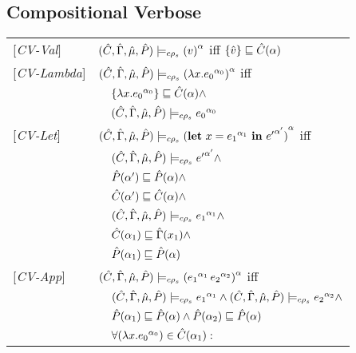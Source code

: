 \subsection{Compositional Verbose}
\begin{table}
\begin{tabular}{l l l l}
{[\textit{CV-Val}]}&\multicolumn{3}{l}{$ \ccestl {v} $ iff $\{\vat\} \sqsubseteq \Cat(\all)$} \\ 
{[\textit{CV-Lambda}]}&\multicolumn{3}{l}{$ \ccestl {\lam{x}{\lbt 0}} $ iff}\\
&&\multicolumn{2}{l}{$\{\lam{x}{\lbt 0}\} \sqsubseteq \Cat(\all) \wedge $}\\
&&\multicolumn{2}{l}{$ \ccest {\lbt 0}$}\\
{[\textit{CV-Let}]}&\multicolumn{3}{l}{$ \ccestl {\letexpr{x}{\lbt 1}{{e'}^{\all'}}}$ iff}\\
&&\multicolumn{2}{l}{$ \ccest {{e'}^{\all'}} \wedge$} \\
&&\multicolumn{2}{l}{$ \Pat(\all') \sqsubseteq \Pat(\all) \wedge$}\\
&&\multicolumn{2}{l}{$ \Cat(\all') \sqsubseteq \Cat(\all) \wedge$}\\
&&\multicolumn{2}{l}{$\ccest {{e_1}^{\all_1}} \wedge$}\\
&&\multicolumn{2}{l}{ $ \Cat(\all_1) \sqsubseteq \Env(x_1) \wedge$} \\
&&\multicolumn{2}{l}{ $ \Pat(\all_1) \sqsubseteq \Pat(\all) $ }\\
{[\textit{CV-App}]}&\multicolumn{3}{l}{$ \ccestl {\appl {\lbt 1} {\lbt 2}}$ iff}\\
&&\multicolumn{2}{l}{$\ccest {\lbt 1} \wedge \ccest {\lbt 2} \wedge$} \\
&&\multicolumn{2}{l}{$\Pat(\all_1) \sqsubseteq \Pat(\all) \wedge \Pat(\all_2) \sqsubseteq \Pat(\all)$} \\
&&\multicolumn{2}{l}{$\forall (\lam{x}{\lbt 0}) \in \Cat(\all_1) :$}\\

\end{tabular}
\end{table}
